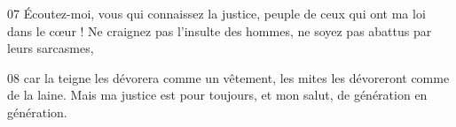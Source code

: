 
07 Écoutez-moi, vous qui connaissez la justice, peuple de ceux qui ont ma loi dans le cœur ! Ne craignez pas l’insulte des hommes, ne soyez pas abattus par leurs sarcasmes,

08 car la teigne les dévorera comme un vêtement, les mites les dévoreront comme de la laine. Mais ma justice est pour toujours, et mon salut, de génération en génération.